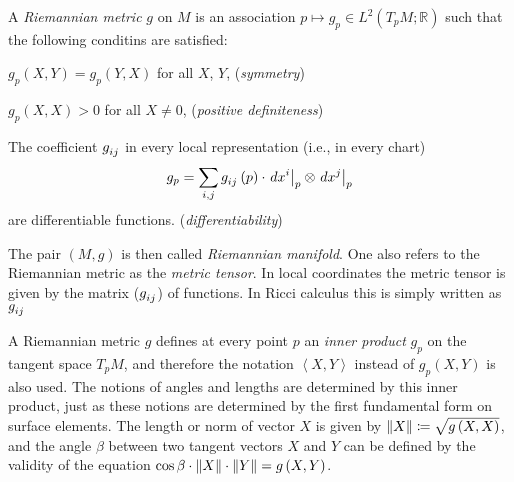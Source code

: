 \documentclass[../main.tex]{subfiles}
\begin{document}
\begin{definition}\label{RiemannianMetric}
    A \textit{Riemannian metric} \(g\) on \(M\)
    is an association \(p\mapsto g_p\in L^2\left(T_pM;\mathbb{R}\right)\)
    such that the following conditins are satisfied:
    \begin{APAenumerate}
        \item \(g_p\left(X,Y\right)=g_p\left(Y,X\right)\) for all \(X\), \(Y\), \hfill (\textit{symmetry})
        \item \(g_p\left(X,X\right)>0\) for all \(X\ne0\), \hfill (\textit{positive definiteness})
        \item The coefficient \(\tensor{g}{_i_j}\) in every local representation (i.e., in every chart) \[g_p=\sum_{i,j}\tensor{g}{_i_j}\left(p\right)\cdot \left.d\tensor{x}{^i}\right|_p \otimes\left.d\tensor{x}{^j}\right|_p\] are differentiable functions. \hfill (\textit{differentiability})
    \end{APAenumerate}
\end{definition}
\begin{remark}\label{RiemannianMannifold}
    The pair \(\left(M,g\right)\) is then called \textit{Riemannian manifold}.
    One also refers to the Riemannian metric as the \textit{metric tensor}.
    In local coordinates the metric tensor is given by the matrix (\(\tensor{g}{_i_j}\)) of functions.
    In Ricci calculus this is simply written as \(\tensor{g}{_i_j}\)
\end{remark}
\begin{remark}\label{Norm_and_Angle_as_RiemannianMetric}
    A Riemannian metric \(g\) defines at every point \(p\)
    an \textit{inner product} \(g_p\) on the tangent space \(T_pM\),
    and therefore the notation \(\left\langle X,Y\right\rangle\) instead of \(g_p\left(X,Y\right)\) is also used.
    The notions of angles and lengths are determined by this inner product,
    just as these notions are determined by the first fundamental form on surface elements.
    The length or norm of vector \(X\) is given by \(\lVert X\rVert\coloneqq\sqrt{g\left(X,X\right)}\),
    and the angle \(\beta\) between two tangent vectors \(X\) and \(Y\)
    can be defined by the validity of the equation \(\cos\beta\cdot\lVert X\rVert\cdot\lVert Y\rVert=g\left(X,Y\right)\).
\end{remark}
\end{document}
